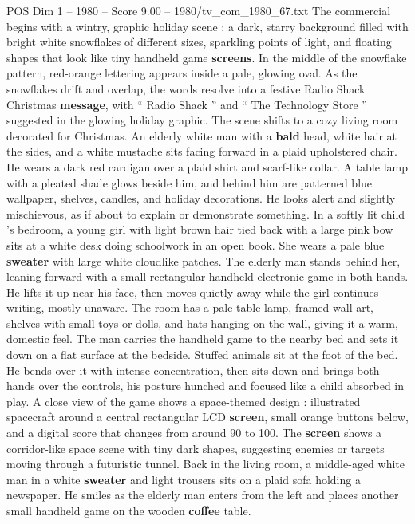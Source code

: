 \begin{textsample}{POS Dim 1 – 1980 – Score 9.00 – 1980/tv\_com\_1980\_67.txt}  \label{ex:f1_pos_054}
The commercial begins with a wintry, graphic holiday scene : a dark, starry background filled with bright white snowflakes of different sizes, sparkling points of light, and floating shapes that look like tiny handheld game \textbf{screens}.
In the middle of the snowflake pattern, red-orange lettering appears inside a pale, glowing oval.
As the snowflakes drift and overlap, the words resolve into a festive Radio Shack Christmas \textbf{message}, with “ Radio Shack ” and “ The Technology Store ” suggested in the glowing holiday graphic.
The scene shifts to a cozy living room decorated for Christmas.
An elderly white man with a \textbf{bald} head, white hair at the sides, and a white mustache sits facing forward in a plaid upholstered chair.
He wears a dark red cardigan over a plaid shirt and scarf-like collar.
A table lamp with a pleated shade glows beside him, and behind him are patterned blue wallpaper, shelves, candles, and holiday decorations.
He looks alert and slightly mischievous, as if about to explain or demonstrate something.
In a softly lit child ’s bedroom, a young girl with light brown hair tied back with a large pink bow sits at a white desk doing schoolwork in an open book.
She wears a pale blue \textbf{sweater} with large white cloudlike patches.
The elderly man stands behind her, leaning forward with a small rectangular handheld electronic game in both hands.
He lifts it up near his face, then moves quietly away while the girl continues writing, mostly unaware.
The room has a pale table lamp, framed wall art, shelves with small toys or dolls, and hats hanging on the wall, giving it a warm, domestic feel.
The man carries the handheld game to the nearby bed and sets it down on a flat surface at the bedside.
Stuffed animals sit at the foot of the bed.
He bends over it with intense concentration, then sits down and brings both hands over the controls, his posture hunched and focused like a child absorbed in play.
A close view of the game shows a space-themed design : illustrated spacecraft around a central rectangular LCD \textbf{screen}, small orange buttons below, and a digital score that changes from around 90 to 100.
The \textbf{screen} shows a corridor-like space scene with tiny dark shapes, suggesting enemies or targets moving through a futuristic tunnel.
Back in the living room, a middle-aged white man in a white \textbf{sweater} and light trousers sits on a plaid sofa holding a newspaper.
He smiles as the elderly man enters from the left and places another small handheld game on the wooden \textbf{coffee} table.

\end{textsample}
